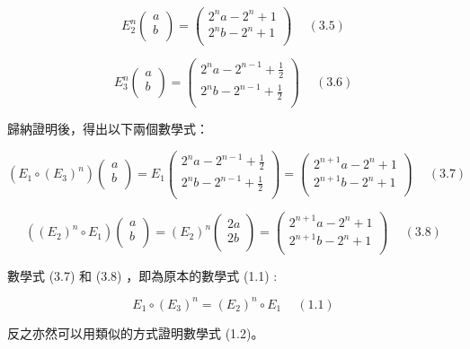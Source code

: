 \documentclass[11pt,UTF8]{ctexart}
\begin{document}
$$E_2^n\left(\begin{matrix}a\\b\\\end{matrix}\right)=\left(\begin{matrix}2^na-2^n+1\\2^nb-2^n+1\\\end{matrix}\right) \quad \ (3.5) $$

$$E_3^n\left(\begin{matrix}a\\b\\\end{matrix}\right)=\left(\begin{matrix}2^na-2^{n-1}+\frac{1}{2}\\2^nb-2^{n-1}+\frac{1}{2}\\\end{matrix}\right) \quad \ (3.6) $$

歸納證明後，得出以下兩個數學式：

$$(E_1 \circ {(E_3)}^n)\left(\begin{matrix}a\\b\\\end{matrix}\right)=E_1\left(\begin{matrix}2^na-2^{n-1}+\frac{1}{2}\\2^nb-2^{n-1}+\frac{1}{2}\\\end{matrix}\right)=\left(\begin{matrix}2^{n+1}a-2^n+ 1 \\2^{n+1}b-2^n+ 1 \\\end{matrix}\right) \quad \ (3.7) $$

$$({(E_2)}^n \circ E_1)\left(\begin{matrix}a\\b\\\end{matrix}\right)={(E_2)}^n\left(\begin{matrix}2a\\2b\\\end{matrix}\right)=\left(\begin{matrix}2^{n+1}a-2^n+1\\2^{n+1}b-2^n+1\\\end{matrix}\right) \quad \ (3.8) $$

數學式 (3.7) 和 (3.8) ，即為原本的數學式 (1.1) :

$$E_{1} \circ (E_{3})^n = (E_{2})^n \circ E_{1} \quad \ (1.1) $$

反之亦然可以用類似的方式證明數學式 (1.2)。


\clearpage
\end{document}
